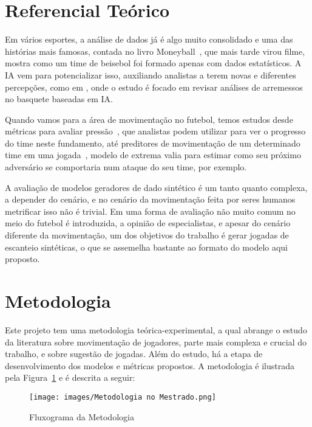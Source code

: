 \documentclass[12pt]{article}
\begin{document}
\section{Referencial Teórico}\label{ref}

Em vários esportes, a análise de dados já é algo muito consolidado e uma das histórias mais famosas, contada no livro Moneyball~\cite{moneyball}, que mais tarde virou filme, mostra como um time de beisebol foi formado apenas com dados estatísticos. A IA vem para potencializar isso, auxiliando analistas a terem novas e diferentes percepções, como em \cite{reviewbasketball}, onde o estudo é focado em revisar análises de arremessos no basquete baseadas em IA. 

Quando vamos para a área de movimentação no futebol, temos estudos desde métricas para avaliar pressão~\cite{pressing}, que analistas podem utilizar para ver o progresso do time neste fundamento, até preditores de movimentação de um determinado time em uma jogada~\cite{le2017data}, modelo de extrema valia para estimar como seu próximo adversário se comportaria num ataque do seu time, por exemplo. 

A avaliação de modelos geradores de dado sintético é um tanto quanto complexa, a depender do cenário, e no cenário da movimentação feita por seres humanos metrificar isso não é trivial. Em \cite{tacticai} uma forma de avaliação não muito comum no meio do futebol é introduzida, a opinião de especialistas, e apesar do cenário diferente da movimentação, um dos objetivos do trabalho é gerar jogadas de escanteio sintéticas, o que se assemelha bastante ao formato do modelo aqui proposto. 

\section{Metodologia}\label{met}
Este projeto tem uma metodologia teórica-experimental, a qual abrange o estudo da literatura sobre movimentação de jogadores, parte mais complexa e crucial do trabalho, e sobre sugestão de jogadas. Além do estudo, há a etapa de desenvolvimento dos modelos e métricas propostos. A metodologia é ilustrada pela Figura~\ref{fig:fluxograma-metodologia} e é descrita a seguir: 
\begin{figure}
    \centering
    \texttt{[image: images/Metodologia no Mestrado.png]}
    \caption{Fluxograma da Metodologia}
    \label{fig:fluxograma-metodologia}
\end{figure}
\end{document}
